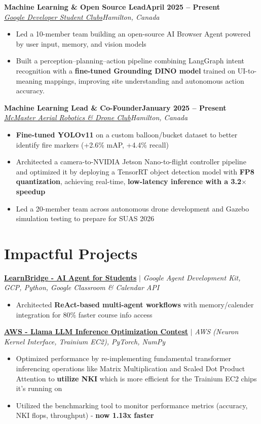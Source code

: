 \documentclass[letterpaper,10pt]{article}
\newcommand{\entry}[4]{\textbf{#1}\hfill\textbf{\small #2}\\\textit{\small #3}\hfill\textit{\small #4}\par}
\begin{document}
\entry{Machine Learning \& Open Source Lead}{April 2025 -- Present}{\href{https://github.com/DSC-McMaster-U/interface-ai}{Google Developer Student Clubs}}{Hamilton, Canada}
\begin{itemize}\small
\item Led a 10-member team building an open-source AI Browser Agent powered by user input, memory, and vision models
\item Built a perception--planning--action pipeline combining LangGraph intent recognition with a \textbf{fine-tuned Grounding DINO model} trained on UI-to-meaning mappings, improving site understanding and autonomous action accuracy.
\end{itemize}\vspace{2pt}
\entry{Machine Learning Lead \& Co-Founder}{January 2025 -- Present}{\href{https://www.macdrones.ca/}{McMaster Aerial Robotics \& Drone Club}}{Hamilton, Canada}
\begin{itemize}\small
\item \textbf{Fine-tuned YOLOv11} on a custom balloon/bucket dataset to better identify fire markers (+2.6\% mAP, +4.4\% recall)
\item Architected a camera-to-NVIDIA Jetson Nano-to-flight controller pipeline and optimized it by deploying a TensorRT object detection model with \textbf{FP8 quantization}, achieving real-time, \textbf{low-latency inference with a 3.2\ensuremath{\times} speedup}
\item Led a 20-member team across autonomous drone development and Gazebo simulation testing to prepare for SUAS 2026
\end{itemize}\vspace{2pt}
\section{Impactful Projects}
{\small\textbf{\href{https://github.com/SachinVedGupta/LearnBridge}{LearnBridge - AI Agent for Students}} $|$ \emph{Google Agent Development Kit, GCP, Python, Google Classroom \& Calendar API}}\par
\begin{itemize}\small
\item Architected \textbf{ReAct-based multi-agent workflows} with memory/calender integration for 80\% faster course info access
\end{itemize}
{\small\textbf{\href{https://github.com/SachinVedGupta/nki-llama}{AWS - Llama LLM Inference Optimization Contest}} $|$ \emph{AWS (Neuron Kernel Interface, Trainium EC2), PyTorch, NumPy}}\par
\begin{itemize}\small
\item Optimized performance by re-implementing fundamental transformer inferencing operations like Matrix Multiplication and Scaled Dot Product Attention to \textbf{utilize NKI} which is more efficient for the Trainium EC2 chips it's running on
\item Utilized the benchmarking tool to monitor performance metrics (accuracy, NKI flops, throughput) - \textbf{now 1.13x faster}
\end{itemize}
\end{document}
